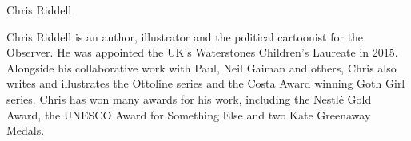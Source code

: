 {\Large Chris Riddell}

\begin{figure}
	\vspace{-10mm}
	\vspace{-10mm}
\end{figure}

Chris Riddell is an author, illustrator and the political cartoonist for the Observer. He was appointed the UK's Waterstones Children's Laureate in 2015. Alongside his collaborative work with Paul, Neil Gaiman and others, Chris also writes and illustrates the Ottoline series and the Costa Award winning Goth Girl series. Chris has won many awards for his work, including the Nestl\'e Gold Award, the UNESCO Award for Something Else and two Kate Greenaway Medals.